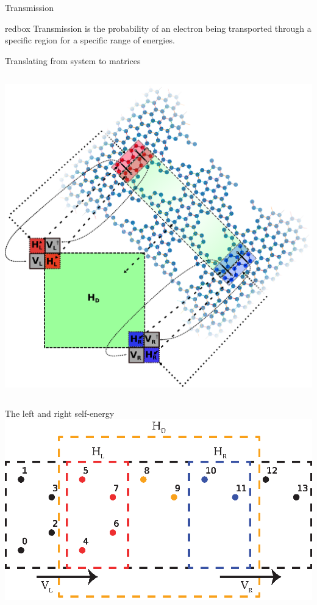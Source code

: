\documentclass[hyperref={colorlinks=true,urlcolor=blue,linkcolor=.},aspectratio=1610,mathserif]{beamer}
\newcommand{\im}[3]{\inputminted[linenos=true, python3=true, firstline=#2, lastline=#3]{python}{#1}}
\begin{document}
\begin{frame}{Transmission}
\centering
\vspace{.05\textwidth}
       \begin{beamercolorbox}[sep=1em,wd=15cm]{redbox}
		Transmission is the probability of an electron being transported through a specific region for a specific range of energies.
	    \end{beamercolorbox}
\end{frame}

\begin{frame}{Translating from system to matrices}
\begin{columns}[c]
    \includegraphics[width=.64\textwidth]{Figures/illu.eps}
\end{columns}
\end{frame}

\begin{frame}{The left and right self-energy}
    \centering
   \includegraphics[width=.6\textwidth]{Figures/2DHam.eps}
   \begin{columns}[c]
          \im{Listings/Functions.py}{210}{212}
   \end{columns}
\end{frame}
\end{document}
